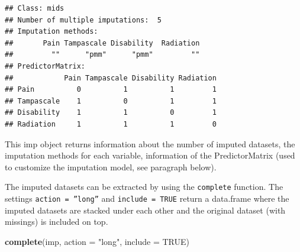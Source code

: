 \documentclass[]{book}
\newenvironment{Shaded}{\begin{snugshade}}{\end{snugshade}}
\newcommand{\KeywordTok}[1]{\textcolor[rgb]{0.13,0.29,0.53}{\textbf{#1}}}
\newcommand{\DataTypeTok}[1]{\textcolor[rgb]{0.13,0.29,0.53}{#1}}
\newcommand{\StringTok}[1]{\textcolor[rgb]{0.31,0.60,0.02}{#1}}
\newcommand{\OtherTok}[1]{\textcolor[rgb]{0.56,0.35,0.01}{#1}}
\newcommand{\NormalTok}[1]{#1}
\begin{document}
\begin{verbatim}
## Class: mids
## Number of multiple imputations:  5 
## Imputation methods:
##       Pain Tampascale Disability  Radiation 
##         ""      "pmm"      "pmm"         "" 
## PredictorMatrix:
##            Pain Tampascale Disability Radiation
## Pain          0          1          1         1
## Tampascale    1          0          1         1
## Disability    1          1          0         1
## Radiation     1          1          1         0
\end{verbatim}

This imp object returns information about the number of imputed
datasets, the imputation methods for each variable, information of the
PredictorMatrix (used to customize the imputation model, see paragraph
below).

The imputed datasets can be extracted by using the \texttt{complete}
function. The settings \texttt{action\ =\ ”long”} and
\texttt{include\ =\ TRUE} return a data.frame where the imputed datasets
are stacked under each other and the original dataset (with missings) is
included on top.

\begin{Shaded}
\begin{Highlighting}[]
\KeywordTok{complete}\NormalTok{(imp, }\DataTypeTok{action =} \StringTok{"long"}\NormalTok{, }\DataTypeTok{include =} \OtherTok{TRUE}\NormalTok{)}
\end{Highlighting}
\end{Shaded}
\end{document}
